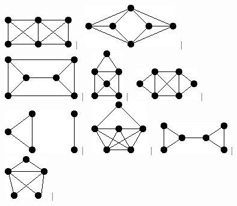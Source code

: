 \documentclass[11pt,paper=b5,footinclude,headinclude]{scrbook} %
\newtheorem{ex}{Vaja\hypertarget{sol:\theex}}[chapter]
\begin{document}
\begin{ex}
\begin{figure}
\includegraphics[scale=0.5]{smallGraphs/g_co-C4U2K1.png}$\,\mid\,$\
\includegraphics[scale=0.5]{smallGraphs/g_co-C4UP2.png}$\,\mid\,$\
\includegraphics[scale=0.5]{smallGraphs/g_co-C6.png}$\,\mid\,$\
\includegraphics[scale=0.5]{smallGraphs/g_co-E.png}$\,\mid\,$\
\includegraphics[scale=0.5]{smallGraphs/g_co-H.png}$\,\mid\,$\
\includegraphics[scale=0.5]{smallGraphs/g_co-K23.png}$\,\mid\,$\
\includegraphics[scale=0.5]{smallGraphs/g_co-K2Uclaw.png}$\,\mid\,$\
\includegraphics[scale=0.5]{smallGraphs/g_co-K33-e.png}$\,\mid\,$\
\includegraphics[scale=0.5]{smallGraphs/g_co-K3U2K1.png}$\,\mid\,$\

\end{figure}
\end{ex}
\end{document}
